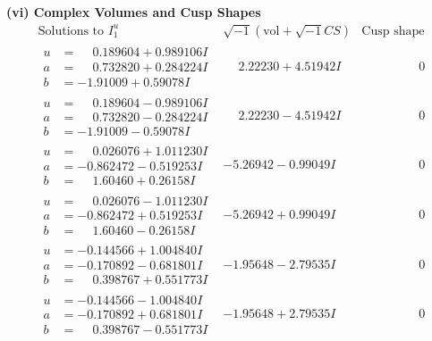 \documentclass[1p]{elsarticle_modified}
\theoremstyle{definition}
\newcommand{\I}{\sqrt{-1}}
\begin{document}
\newpage\flushleft \textbf{(vi) Complex Volumes and Cusp Shapes}
$$\begin{array}{c|c|c}  
\text{Solutions to }I^u_{1}& \I (\text{vol} + \sqrt{-1}CS) & \text{Cusp shape}\\
 \hline 
\begin{aligned}
u &= \phantom{-}0.189604 + 0.989106 I \\
a &= \phantom{-}0.732820 + 0.284224 I \\
b &= -1.91009 + 0.59078 I\end{aligned}
 & \phantom{-}2.22230 + 4.51942 I & \phantom{-0.000000 } 0 \\ \hline\begin{aligned}
u &= \phantom{-}0.189604 - 0.989106 I \\
a &= \phantom{-}0.732820 - 0.284224 I \\
b &= -1.91009 - 0.59078 I\end{aligned}
 & \phantom{-}2.22230 - 4.51942 I & \phantom{-0.000000 } 0 \\ \hline\begin{aligned}
u &= \phantom{-}0.026076 + 1.011230 I \\
a &= -0.862472 - 0.519253 I \\
b &= \phantom{-}1.60460 + 0.26158 I\end{aligned}
 & -5.26942 - 0.99049 I & \phantom{-0.000000 } 0 \\ \hline\begin{aligned}
u &= \phantom{-}0.026076 - 1.011230 I \\
a &= -0.862472 + 0.519253 I \\
b &= \phantom{-}1.60460 - 0.26158 I\end{aligned}
 & -5.26942 + 0.99049 I & \phantom{-0.000000 } 0 \\ \hline\begin{aligned}
u &= -0.144566 + 1.004840 I \\
a &= -0.170892 - 0.681801 I \\
b &= \phantom{-}0.398767 + 0.551773 I\end{aligned}
 & -1.95648 - 2.79535 I & \phantom{-0.000000 } 0 \\ \hline\begin{aligned}
u &= -0.144566 - 1.004840 I \\
a &= -0.170892 + 0.681801 I \\
b &= \phantom{-}0.398767 - 0.551773 I\end{aligned}
 & -1.95648 + 2.79535 I & \phantom{-0.000000 } 0 \\ \hline\begin{aligned}

\end{aligned}
\end{array}$$
\end{document}
